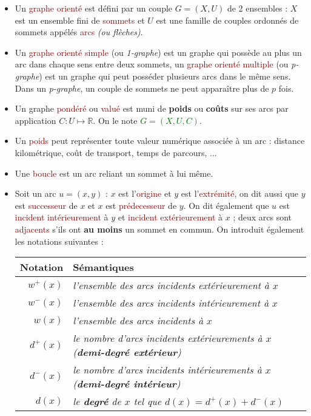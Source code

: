 \documentclass{article}
\newcommand{\gre}[1]{\textcolor{darkgreen}{#1}}
\newcommand{\red}[1]{\textcolor{darkred}{#1}}
\newcommand{\R}{\mathbb{R}}
\begin{document}
\noindent\begin{itemize}
\item Un \red{graphe orienté} est défini par un couple $G=(X,U)$ de 2 ensembles : $X$ est un ensemble fini de \red{sommets} et $U$ est une famille de couples ordonnés de 
sommets appélés \red{arcs} \textit{(ou flèches)}.
\item Un \red{graphe orienté simple} (ou \textit{1-graphe}) est un graphe qui possède au plus un arc dans chaque sens entre deux sommets, un \red{graphe orienté multiple} (ou 
\textit{p-graphe}) est un graphe qui peut posséder plusieurs arcs dans le même sens. Dans un \textit{p-graphe}, un couple de sommets ne peut apparaître plus de $p$ fois.
\item Un graphe \red{pondéré} ou \red{valué} est muni de \textbf{poids} ou \textbf{coûts} sur ses arcs par application $C:U\mapsto \R$. On le note \gre{$G=(X,U,C)$}.
\item Un \red{poids} peut représenter toute valeur numérique associée à un arc : distance kilométrique, coût de transport, temps de parcours, ...
\item Une \red{boucle} est un arc reliant un sommet à lui même.
\item Soit un arc $u=(x,y)$ : $x$ est l'\red{origine} et $y$ est l'\red{extrémité}, on dit aussi que $y$ est \red{successeur} de $x$ et $x$ est \red{prédecesseur} de $y$. On dit 
également que $u$ est \red{incident intérieurement} à $y$ et \red{incident extérieurement} à $x$ ; deux arcs sont \red{adjacents} s'ils ont \textbf{au moins} un sommet en 
commun. On introduit également les notations suivantes : \\
\begin{center}
	\begin{tabular}{r|l}
	\textbf{Notation} & \textbf{Sémantiques} \\
	\hline
	$w^+(x)$ & \textit{l'ensemble des arcs incidents extérieurement à $x$}	\\
	$w^-(x)$ & \textit{l'ensemble des arcs incidents intérieurement à $x$}	\\
	$w(x)$ & \textit{l'ensemble des arcs incidents à $x$}	\\
	$d^+(x) $ & \textit{le nombre d'arcs incidents extérieurements à $x$ (\textbf{demi-degré extérieur})} \\
	$d^-(x) $ & \textit{le nombre d'arcs incidents intérieurements à $x$ (\textbf{demi-degré intérieur})} \\
	$d(x)$ & \textit{le \textbf{degré} de $x$ tel que $d(x) = d^+(x) + d^-(x)$} \\

\end{tabular}
\end{center}
\end{itemize}
\end{document}
